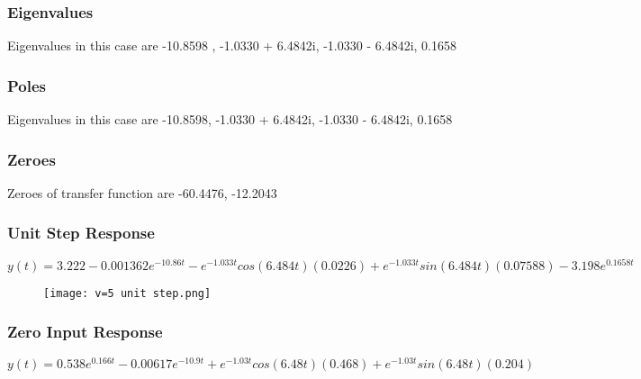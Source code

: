 \documentclass[notitlepage]{article}
\begin{document}
\subsubsection{Eigenvalues} 
Eigenvalues in this case are -10.8598 , -1.0330 + 6.4842i, -1.0330 - 6.4842i,  0.1658 
\subsubsection{Poles}
Eigenvalues in this case are -10.8598, -1.0330 + 6.4842i, -1.0330 - 6.4842i,  0.1658 
\subsubsection{Zeroes}
Zeroes of transfer function are -60.4476, -12.2043

\newpage
\subsubsection{Unit Step Response}
$$y(t)=3.222 - 0.001362e^{-10.86t} - e^{-1.033t}cos(6.484t)(0.0226) + e^{-1.033t}sin(6.484t)(0.07588) - 3.198e^{0.1658t}$$
\begin{figure}[!h]
    \centering
    \texttt{[image: v=5 unit step.png]}
    \label{fig:my_label}
\end{figure}

\newpage
\subsubsection{Zero Input Response}
\vspace{1mm}


\vspace{1mm}

$y(t)=0.538e^{0.166t} - 0.00617e^{-10.9t} + e^{-1.03t}cos(6.48t)(0.468)+e^{-1.03t}sin(6.48t)(0.204)$
\vspace{2mm}
\end{document}
